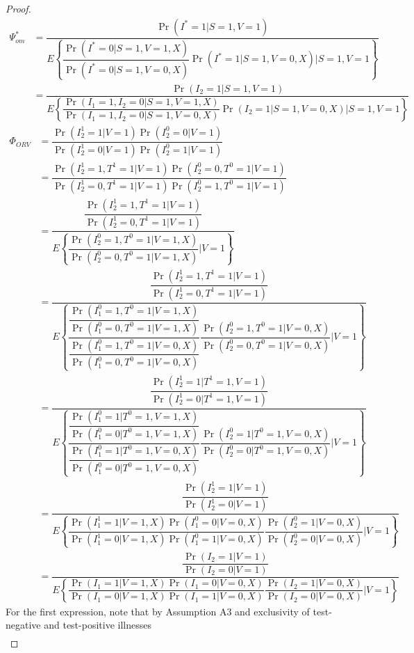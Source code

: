 \begin{appendix}
    \begin{proof}
    \begin{align*}
        \Psi_{om}^* &= \dfrac{\Pr(I^* = 1 | S = 1, V = 1)}{E\left\{ \dfrac{\Pr(I^* = 0 | S = 1, V = 1, X)}{\Pr(I^* = 0 | S = 1, V = 0, X)} \Pr(I^* = 1 | S = 1, V = 0, X) \bigg| S = 1, V = 1\right\}} \\
        &= \dfrac{\Pr(I_2 = 1 | S = 1, V = 1)}{E\left\{ \dfrac{\Pr(I_1 = 1, I_2 = 0  | S = 1, V = 1, X)}{\Pr(I_1 = 1, I_2 = 0 | S = 1, V = 0, X)} \Pr(I_2 = 1 | S = 1, V = 0, X) \bigg| S = 1, V = 1\right\}} 
    \end{align*}
    \begin{align*}
        \Phi_{ORV} &= \dfrac{\Pr(I^1_2=1|V=1)\Pr(I^0_2=0|V=1)}{\Pr(I^1_2=0|V=1)\Pr(I^0_2=1|V=1)} \\
        &=\dfrac{\Pr(I^1_2=1, T^1 = 1|V=1)\Pr(I^0_2=0, T^0 = 1|V=1)}{\Pr(I^1_2=0, T^1 = 1|V=1)\Pr(I^0_2=1, T^0 = 1|V=1)} \\
        &=\dfrac{\dfrac{\Pr(I^1_2=1, T^1 = 1|V=1)}{\Pr(I^1_2=0, T^1 = 1|V=1)}}{E\left\{\dfrac{\Pr(I^0_2=1, T^0 =1|V=1, X)}{\Pr(I^0_2=0, T^0 = 1|V=1, X)}\bigg| V = 1\right\}} \\
        &=\dfrac{\dfrac{\Pr(I^1_2=1, T^1 = 1|V=1)}{\Pr(I^1_2=0, T^1 = 1|V=1)}}{E\left\{\dfrac{\dfrac{\Pr(I^0_1=1, T^0 = 1|V=1, X)}{\Pr(I^0_1=0, T^0 = 1|V=1, X)}}{\dfrac{\Pr(I^0_1=1, T^0 = 1|V=0, X)}{\Pr(I^0_1=0, T^0 = 1|V=0, X)}}\dfrac{\Pr(I^0_2=1, T^0 = 1|V=0, X)}{\Pr(I^0_2=0, T^0 = 1|V=0, X)}\bigg| V = 1\right\}} \\
        &=\dfrac{\dfrac{\Pr(I^1_2=1| T^1 = 1, V=1)}{\Pr(I^1_2=0 | T^1 = 1, V=1)}}{E\left\{\dfrac{\dfrac{\Pr(I^0_1=1 | T^0 = 1, V=1, X)}{\Pr(I^0_1=0 | T^0 = 1, V=1, X)}}{\dfrac{\Pr(I^0_1=1 | T^0 = 1, V=0, X)}{\Pr(I^0_1=0 | T^0 = 1, V=0, X)}}\dfrac{\Pr(I^0_2=1 | T^0 = 1, V=0, X)}{\Pr(I^0_2=0 | T^0 = 1,   V=0, X)}\bigg| V = 1\right\}} \\
        &=\dfrac{\dfrac{\Pr(I^1_2=1|V=1)}{\Pr(I^1_2=0|V=1)}}{E\left\{\dfrac{\Pr(I^1_1=1|V=1, X)\Pr(I^0_1=0|V=0, X)}{\Pr(I^1_1=0|V=1, X)\Pr(I^0_1=1|V=0, X)}\dfrac{\Pr(I^0_2=1|V=0, X)}{\Pr(I^0_2=0|V=0, X)}\bigg| V = 1\right\}} \\
        &=\dfrac{\dfrac{\Pr(I_2=1|V=1)}{\Pr(I_2=0|V=1)}}{E\left\{\dfrac{\Pr(I_1=1|V=1, X)\Pr(I_1=0|V=0, X)}{\Pr(I_1=0|V=1, X)\Pr(I_1=1|V=0, X)}\dfrac{\Pr(I_2=1|V=0, X)}{\Pr(I_2=0|V=0, X)}\bigg| V = 1\right\}}
    \end{align*}
    For the first expression, note that by Assumption A3 and exclusivity of test-negative and test-positive illnesses
    \begin{align*}

\end{align*}
\end{proof}
\end{appendix}
